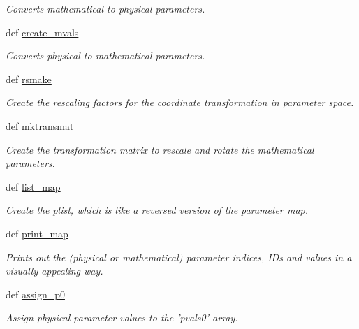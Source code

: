 \begin{DoxyCompactItemize}
\begin{DoxyCompactList}\small\item\em Converts mathematical to physical parameters. \end{DoxyCompactList}\item 
def \hyperlink{classforcebalance_1_1forcefield_1_1FF_ae5fba4d3e22f210632ead3653e6e12dd}{create\-\_\-mvals}
\begin{DoxyCompactList}\small\item\em Converts physical to mathematical parameters. \end{DoxyCompactList}\item 
def \hyperlink{classforcebalance_1_1forcefield_1_1FF_a88715f96ff8e14c3c83b4f976ad147b4}{rsmake}
\begin{DoxyCompactList}\small\item\em Create the rescaling factors for the coordinate transformation in parameter space. \end{DoxyCompactList}\item 
def \hyperlink{classforcebalance_1_1forcefield_1_1FF_acf0ce8fc4e9fbf5257f93d14d4a4f10f}{mktransmat}
\begin{DoxyCompactList}\small\item\em Create the transformation matrix to rescale and rotate the mathematical parameters. \end{DoxyCompactList}\item 
def \hyperlink{classforcebalance_1_1forcefield_1_1FF_ac0046446695a65cb2489fdb560ef5929}{list\-\_\-map}
\begin{DoxyCompactList}\small\item\em Create the plist, which is like a reversed version of the parameter map. \end{DoxyCompactList}\item 
def \hyperlink{classforcebalance_1_1forcefield_1_1FF_a61082e99cb3a02e35c80bbea919eaafa}{print\-\_\-map}
\begin{DoxyCompactList}\small\item\em Prints out the (physical or mathematical) parameter indices, I\-Ds and values in a visually appealing way. \end{DoxyCompactList}\item 
def \hyperlink{classforcebalance_1_1forcefield_1_1FF_a3af07734a2378364ed533e2853ee6b82}{assign\-\_\-p0}
\begin{DoxyCompactList}\small\item\em Assign physical parameter values to the 'pvals0' array. \end{DoxyCompactList}\item 

\end{DoxyCompactItemize}
